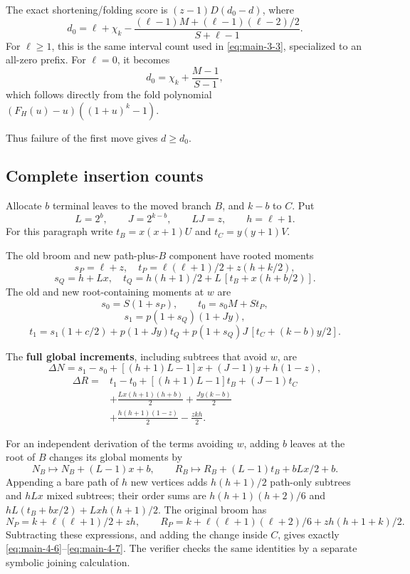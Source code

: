 \documentclass[11pt,reqno]{amsart}
\theoremstyle{plain}
\begin{document}
The exact shortening/folding score is \((z-1)D(d_0-d)\), where \[
\boxed{
d_0=\ell+\chi_k-
\frac{(\ell-1)M+(\ell-1)(\ell-2)/2}{S+\ell-1}.
}
\tag{4.3}\label{eq:main-4-3}
\] For \(\ell\ge1\), this is the same interval count used in \eqref{eq:main-3-3}, specialized to an all-zero prefix. For \(\ell=0\), it becomes \[
d_0=\chi_k+\frac{M-1}{S-1},
\] which follows directly from the fold polynomial \((F_H(u)-u)((1+u)^k-1)\).

Thus failure of the first move gives \(d\ge d_0\).

\subsection{Complete insertion counts}\label{complete-insertion-counts}

Allocate \(b\) terminal leaves to the moved branch \(B\), and \(k-b\) to \(C\). Put \[
L=2^b,\qquad J=2^{k-b},\qquad LJ=z,\qquad h=\ell+1.
\] For this paragraph write \(t_B=x(x+1)U\) and \(t_C=y(y+1)V\).

The old broom and new path-plus-\(B\) component have rooted moments \[
s_P=\ell+z,\quad
 t_P=\ell(\ell+1)/2+z(h+k/2),
\] \[
s_Q=h+Lx,\quad
 t_Q=h(h+1)/2+L\,[t_B+x(h+b/2)].
\tag{4.4}\label{eq:main-4-4}
\] The old and new root-containing moments at \(w\) are \[
s_0=S(1+s_P),\qquad t_0=s_0M+St_P,
\] \[
s_1=p(1+s_Q)(1+Jy),
\] \[
t_1=s_1(1+c/2)+p(1+Jy)t_Q
     +p(1+s_Q)J\,[t_C+(k-b)y/2].
\tag{4.5}\label{eq:main-4-5}
\]

The \textbf{full global increments}, including subtrees that avoid \(w\), are \[
\boxed{
\Delta N=s_1-s_0+[(h+1)L-1]x+(J-1)y+h(1-z),
}
\tag{4.6}\label{eq:main-4-6}
\] \[
\boxed{
\begin{aligned}
\Delta R={}&t_1-t_0+[(h+1)L-1]t_B+(J-1)t_C\\
&+\frac{Lx(h+1)(h+b)}2+\frac{Jy(k-b)}2\\
&+\frac{h(h+1)(1-z)}2-\frac{zkh}{2}.
\end{aligned}
}
\tag{4.7}\label{eq:main-4-7}
\]

For an independent derivation of the terms avoiding \(w\), adding \(b\) leaves at the root of \(B\) changes its global moments by \[
N_B\mapsto N_B+(L-1)x+b,
\qquad
R_B\mapsto R_B+(L-1)t_B+bLx/2+b.
\] Appending a bare path of \(h\) new vertices adds \(h(h+1)/2\) path-only subtrees and \(hLx\) mixed subtrees; their order sums are \(h(h+1)(h+2)/6\) and \(hL(t_B+bx/2)+Lxh(h+1)/2\). The original broom has \[
N_P=k+\ell(\ell+1)/2+zh,
\qquad
R_P=k+\ell(\ell+1)(\ell+2)/6+zh(h+1+k)/2.
\] Subtracting these expressions, and adding the change inside \(C\), gives exactly \eqref{eq:main-4-6}--\eqref{eq:main-4-7}. The verifier checks the same identities by a separate symbolic joining calculation.
\end{document}
